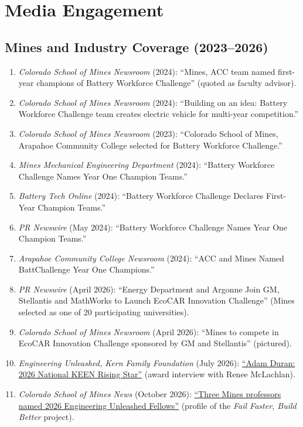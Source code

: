 \documentclass[11pt,letterpaper]{article}
\begin{document}
\section{Media Engagement}

\subsection{Mines and Industry Coverage (2023--2026)}

\begin{enumerate}[noitemsep]
  \item \textit{Colorado School of Mines Newsroom} (2024): ``Mines, ACC team named first-year champions of Battery Workforce Challenge'' (quoted as faculty advisor).
  \item \textit{Colorado School of Mines Newsroom} (2024): ``Building on an idea: Battery Workforce Challenge team creates electric vehicle for multi-year competition.''
  \item \textit{Colorado School of Mines Newsroom} (2023): ``Colorado School of Mines, Arapahoe Community College selected for Battery Workforce Challenge.''
  \item \textit{Mines Mechanical Engineering Department} (2024): ``Battery Workforce Challenge Names Year One Champion Teams.''
  \item \textit{Battery Tech Online} (2024): ``Battery Workforce Challenge Declares First-Year Champion Teams.''
  \item \textit{PR Newswire} (May 2024): ``Battery Workforce Challenge Names Year One Champion Teams.''
  \item \textit{Arapahoe Community College Newsroom} (2024): ``ACC and Mines Named BattChallenge Year One Champions.''
  \item \textit{PR Newswire} (April 2026): ``Energy Department and Argonne Join GM, Stellantis and MathWorks to Launch EcoCAR Innovation Challenge'' (Mines selected as one of 20 participating universities).
  \item \textit{Colorado School of Mines Newsroom} (April 2026): ``Mines to compete in EcoCAR Innovation Challenge sponsored by GM and Stellantis'' (pictured).
  \item \textit{Engineering Unleashed, Kern Family Foundation} (July 2026): \href{https://engineeringunleashed.com/keen-rising-star-adam-duran}{``Adam Duran: 2026 National KEEN Rising Star''} (award interview with Renee McLachlan).
  \item \textit{Colorado School of Mines News} (October 2026): \href{https://www.mines.edu/news/all-news/2026/three-mines-professors-named-2026-engineering-unleashed-fellows.html}{``Three Mines professors named 2026 Engineering Unleashed Fellows''} (profile of the \textit{Fail Faster, Build Better} project).
\end{enumerate}
\end{document}
